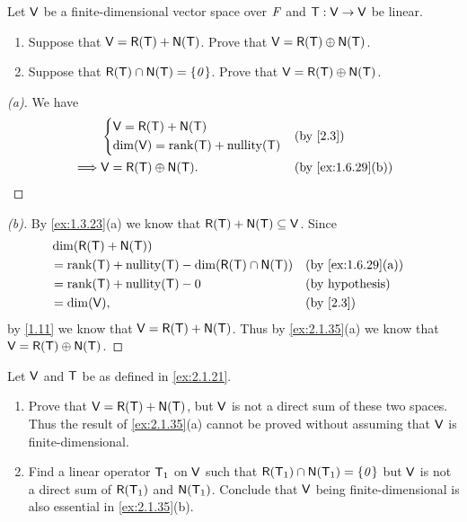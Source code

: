 \begin{ex}\label{ex:2.1.35}
	Let \(\mathsf{V}\) be a finite-dimensional vector space over \(\mathit{F}\) and \(\mathsf{T} : \mathsf{V} \to \mathsf{V}\) be linear.
	\begin{enumerate}
		\item Suppose that \(\V = \rg{\T} + \ns{\T}\).
		      Prove that \(\V = \rg{\T} \oplus \ns{\T}\).
		\item Suppose that \(\rg{\T} \cap \ns{\T} = \set{\zv}\).
		      Prove that \(\V = \rg{\T} \oplus \ns{\T}\).
	\end{enumerate}
\end{ex}

\begin{proof}[(a)]
	We have
	\begin{align*}
		         & \begin{dcases}
			           \V = \rg{\T} + \ns{\T} \\
			           \dim(\V) = \rk{\T} + \nt{\T}
		           \end{dcases} &  & \by{2.3}                         \\
		\implies & \V = \rg{\T} \oplus \ns{\T}. &  & \by{ex:1.6.29}[b]
	\end{align*}
\end{proof}

\begin{proof}[(b)]
	By \cref{ex:1.3.23}(a) we know that \(\rg{\T} + \ns{\T} \subseteq \V\).
	Since
	\begin{align*}
		 & \dim(\rg{\T} + \ns{\T})                                                      \\
		 & = \rk{\T} + \nt{\T} - \dim(\rg{\T} \cap \ns{\T}) &  & \by{ex:1.6.29}[a]      \\
		 & = \rk{\T} + \nt{\T} - 0                          &  & \text{(by hypothesis)} \\
		 & = \dim(\V),                                      &  & \by{2.3}
	\end{align*}
	by \cref{1.11} we know that \(\V = \rg{\T} + \ns{\T}\).
	Thus by \cref{ex:2.1.35}(a) we know that \(\V = \rg{\T} \oplus \ns{\T}\).
\end{proof}

\begin{ex}\label{ex:2.1.36}
	Let \(\mathsf{V}\) and \(\mathsf{T}\) be as defined in \cref{ex:2.1.21}.
	\begin{enumerate}
		\item Prove that \(\V = \rg{\T} + \ns{\T}\), but \(\mathsf{V}\) is not a direct sum of these two spaces.
		      Thus the result of \cref{ex:2.1.35}(a) cannot be proved without assuming that \(\mathsf{V}\) is finite-dimensional.
		\item Find a linear operator \(\mathsf{T}_1\) on \(\mathsf{V}\) such that \(\rg{\T_1} \cap \ns{\T_1} = \set{\zv}\) but \(\mathsf{V}\) is not a direct sum of \(\rg{\T_1}\) and \(\ns{\T_1}\).
		      Conclude that \(\mathsf{V}\) being finite-dimensional is also essential in \cref{ex:2.1.35}(b).
	\end{enumerate}
\end{ex}

